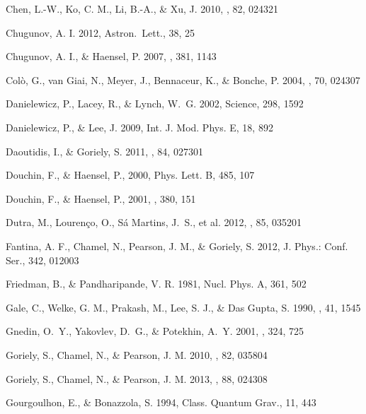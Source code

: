 \documentclass{aa}
\begin{document}
\begin{thebibliography}{}
Chen, L.-W., Ko, C. M., Li, B.-A., \& Xu, J.
2010, 
\prc, 82,  024321

Chugunov, A. I.
2012,
Astron.~Lett., 38, 25

Chugunov, A. I., \& Haensel, P.
2007,
\mnras, 381, 1143

Col{\`o}, G., van Giai, N., Meyer, J., Bennaceur, K., \& Bonche, P.
2004, 
\prc, 70, 024307 

Danielewicz, P., Lacey, R., \& Lynch, W.~G. 
2002, 
Science, 298, 1592 

Danielewicz, P., \& Lee, J.
2009,
Int. J. Mod. Phys. E, 18, 892
 
Daoutidis, I., \& Goriely, S.
2011,
\prc, 84, 027301 

Douchin, F., \& Haensel, P., 
2000,
Phys. Lett. B, 485, 107

Douchin, F., \& Haensel, P., 
2001,
\aap, 380, 151

Dutra, M., Louren{\c c}o, O., S{\'a} Martins, J.~S., et al.
2012, 
\prc, 85, 035201 

Fantina, A. F., Chamel, N., Pearson, J. M., \& Goriely, S.
2012,
J. Phys.: Conf. Ser., 342, 012003

Friedman, B., \& Pandharipande, V. R.
1981,
Nucl. Phys. A, 361, 502

Gale, C., Welke, G. M., Prakash, M., Lee, S. J., \& Das Gupta, S.
1990,
\prc, 41, 1545

Gnedin, O.~Y., Yakovlev, D.~G., \& Potekhin, A.~Y.
2001,
\mnras, 324, 725

Goriely, S., Chamel, N., \& Pearson, J. M.
2010,
\prc, 82, 035804

Goriely, S., Chamel, N., \& Pearson, J. M.
2013,
\prc, 88, 024308

Gourgoulhon, E., \& Bonazzola, S.
1994, 
Class. Quantum Grav., 11, 443 


\end{thebibliography}
\end{document}
